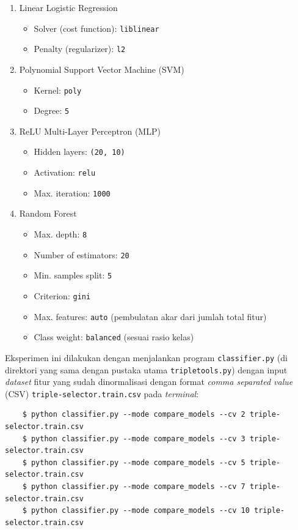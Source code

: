 \begin{enumerate}

	\item Linear Logistic Regression
	\begin{itemize}
		\item Solver (cost function): \verb|liblinear|
		\item Penalty (regularizer): \verb|l2|
	\end{itemize}

	\item Polynomial Support Vector Machine (SVM)
	\begin{itemize}
		\item Kernel: \verb|poly|
		\item Degree: \verb|5|
	\end{itemize}

	\item ReLU Multi-Layer Perceptron (MLP)
	\begin{itemize}
		\item Hidden layers: \verb|(20, 10)|
		\item Activation: \verb|relu| \citep{nair2010rectified}
		\item Max. iteration: \verb|1000|
	\end{itemize}
	
	\item Random Forest
	\begin{itemize}
		\item Max. depth: \verb|8|
		\item Number of estimators: \verb|20|
		\item Min. samples split: \verb|5|
		\item Criterion: \verb|gini| \citep{mingers1989empirical}
		\item Max. features: \verb|auto| (pembulatan akar dari jumlah total fitur)
		\item Class weight: \verb|balanced| (sesuai rasio kelas)
	\end{itemize}

\end{enumerate}

Eksperimen ini dilakukan dengan menjalankan program \verb|classifier.py| (di direktori yang sama dengan pustaka utama \verb|tripletools.py|) dengan input \textit{dataset} fitur yang sudah dinormalisasi dengan format \textit{comma separated value} (CSV) \verb|triple-selector.train.csv| pada \textit{terminal}:

\begin{verbatim}
	$ python classifier.py --mode compare_models --cv 2 triple-selector.train.csv
	$ python classifier.py --mode compare_models --cv 3 triple-selector.train.csv
	$ python classifier.py --mode compare_models --cv 5 triple-selector.train.csv
	$ python classifier.py --mode compare_models --cv 7 triple-selector.train.csv
	$ python classifier.py --mode compare_models --cv 10 triple-selector.train.csv
\end{verbatim}


